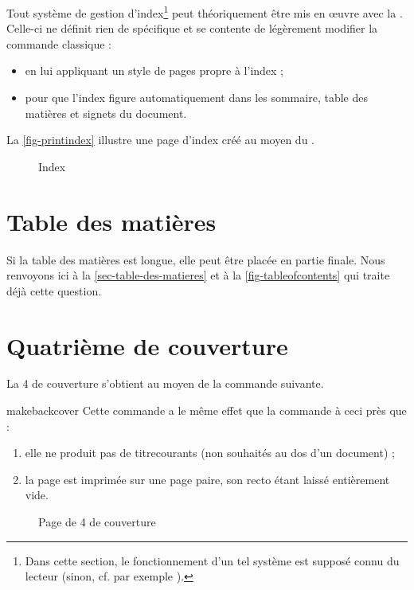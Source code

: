Tout système de gestion d'index\footnote{Dans cette section, le fonctionnement
  d'un tel système est supposé connu du lecteur (sinon, cf. par exemple
  \cite{en-ligne7}).} peut théoriquement être mis en œuvre avec la
\yatCl{}. Celle-ci ne définit rien de spécifique et se contente de légèrement
modifier la commande  classique :
\begin{itemize}
\item en lui appliquant un style de pages propre à l'index ;
\item pour que l'index figure automatiquement dans les
  sommaire, table des matières et signets du document.
\end{itemize}

La \vref{fig-printindex} illustre une page d'index créé au moyen du
.

\begin{figure}[htbp]
  \centering
  \caption{Index}
  \label{fig-printindex}
\end{figure}

\section{Table des matières}
%

Si la table des matières est longue, elle peut être placée en partie
finale. Nous renvoyons ici à la \vref{sec-table-des-matieres} et à la
\vref{fig-tableofcontents} qui traite déjà cette question.

\section{Quatrième de couverture}\label{sec-quatr-de-couv}
%
%

La 4\ieme{} de couverture s'obtient au moyen de la commande
 suivante.

\begin{docCommand}{makebackcover}{}
  Cette commande a le même effet que la commande 
  à ceci près que :
  \begin{enumerate}
  \item elle ne produit pas de \glspl{titrecourant} (non souhaités au dos d'un
    document) ;
  \item la page est imprimée sur une page paire, son recto étant
    laissé entièrement vide.
  \end{enumerate}
\end{docCommand}

\begin{figure}[htbp]
  \centering
  \caption{Page de 4\ieme{} de couverture}
  \label{fig-makebackcover}
\end{figure}

